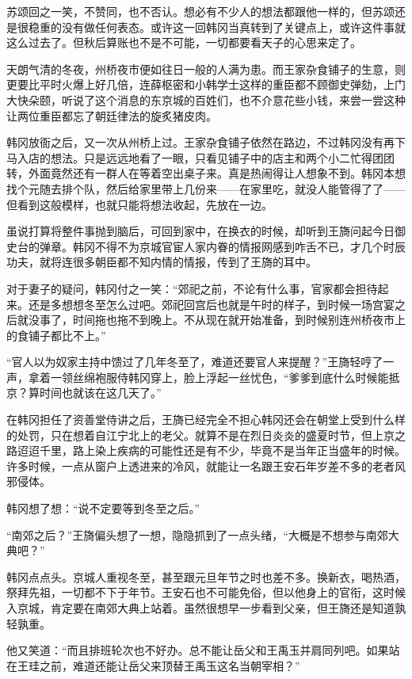 苏颂回之一笑，不赞同，也不否认。想必有不少人的想法都跟他一样的，但苏颂还是很稳重的没有做任何表态。或许这一回韩冈当真转到了关键点上，或许这件事就这么过去了。但秋后算账也不是不可能，一切都要看天子的心思来定了。

天朗气清的冬夜，州桥夜市便如往日一般的人满为患。而王家杂食铺子的生意，则更要比平时火爆上好几倍，连薛枢密和小韩学士这样的重臣都不顾御史弹劾，上门大快朵颐，听说了这个消息的东京城的百姓们，也不介意花些小钱，来尝一尝这种让两位重臣都忘了朝廷律法的旋炙猪皮肉。

韩冈放衙之后，又一次从州桥上过。王家杂食铺子依然在路边，不过韩冈没有再下马入店的想法。只是远远地看了一眼，只看见铺子中的店主和两个小二忙得团团转，外面竟然还有一群人在等着空出桌子来。真是热闹得让人想象不到。韩冈本想找个元随去排个队，然后给家里带上几份来——在家里吃，就没人能管得了了——但看到这般模样，也就只能将想法收起，先放在一边。

虽说打算将整件事抛到脑后，可回到家中，在换衣的时候，却听到王旖问起今日御史台的弹章。韩冈不得不为京城官宦人家内眷的情报网感到咋舌不已，才几个时辰功夫，就将连很多朝臣都不知内情的情报，传到了王旖的耳中。

对于妻子的疑问，韩冈付之一笑：“郊祀之前，不论有什么事，官家都会担待起来。还是多想想冬至怎么过吧。郊祀回宫后也就是午时的样子，到时候一场宫宴之后就没事了，时间拖也拖不到晚上。不从现在就开始准备，到时候别连州桥夜市上的食铺子都比不上。”

“官人以为奴家主持中馈过了几年冬至了，难道还要官人来提醒？”王旖轻哼了一声，拿着一领丝绵袍服侍韩冈穿上，脸上浮起一丝忧色，“爹爹到底什么时候能抵京？算时间也就该在这几天了。”

在韩冈担任了资善堂侍讲之后，王旖已经完全不担心韩冈还会在朝堂上受到什么样的处罚，只在想着自江宁北上的老父。就算不是在烈日炎炎的盛夏时节，但上京之路迢迢千里，路上染上疾病的可能性还是有不少，毕竟不是当年正当盛年的时候。许多时候，一点从窗户上透进来的冷风，就能让一名跟王安石年岁差不多的老者风邪侵体。

韩冈想了想：“说不定要等到冬至之后。”

“南郊之后？”王旖偏头想了一想，隐隐抓到了一点头绪，“大概是不想参与南郊大典吧？”

韩冈点点头。京城人重视冬至，甚至跟元旦年节之时也差不多。换新衣，喝热酒，祭拜先祖，一切都不下于年节。王安石也不可能免俗，但以他身上的官衔，这时候入京城，肯定要在南郊大典上站着。虽然很想早一步看到父亲，但王旖还是知道孰轻孰重。

他又笑道：“而且排班轮次也不好办。总不能让岳父和王禹玉并肩同列吧。如果站在王珪之前，难道还能让岳父来顶替王禹玉这名当朝宰相？”

